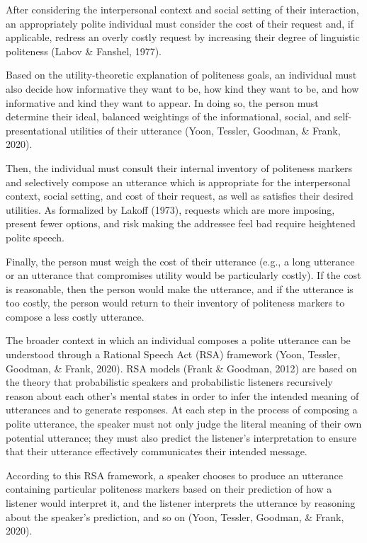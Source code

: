 \documentclass[
  english,
  man,floatsintext]{apa6}
\begin{document}
After considering the interpersonal context and social setting of their interaction, an appropriately polite individual must consider the cost of their request and, if applicable, redress an overly costly request by increasing their degree of linguistic politeness (Labov \& Fanshel, 1977).

Based on the utility-theoretic explanation of politeness goals, an individual must also decide how informative they want to be, how kind they want to be, and how informative and kind they want to appear. In doing so, the person must determine their ideal, balanced weightings of the informational, social, and self- presentational utilities of their utterance (Yoon, Tessler, Goodman, \& Frank, 2020).

Then, the individual must consult their internal inventory of politeness markers and selectively compose an utterance which is appropriate for the interpersonal context, social setting, and cost of their request, as well as satisfies their desired utilities. As formalized by Lakoff (1973), requests which are more imposing, present fewer options, and risk making the addressee feel bad require heightened polite speech.

Finally, the person must weigh the cost of their utterance (e.g., a long utterance or an utterance that compromises utility would be particularly costly). If the cost is reasonable, then the person would make the utterance, and if the utterance is too costly, the person would return to their inventory of politeness markers to compose a less costly utterance.

The broader context in which an individual composes a polite utterance can be understood through a Rational Speech Act (RSA) framework (Yoon, Tessler, Goodman, \& Frank, 2020). RSA models (Frank \& Goodman, 2012) are based on the theory that probabilistic speakers and probabilistic listeners recursively reason about each other's mental states in order to infer the intended meaning of utterances and to generate responses. At each step in the process of composing a polite utterance, the speaker must not only judge the literal meaning of their own potential utterance; they must also predict the listener's interpretation to ensure that their utterance effectively communicates their intended message.

According to this RSA framework, a speaker chooses to produce an utterance containing particular politeness markers based on their prediction of how a listener would interpret it, and the listener interprets the utterance by reasoning about the speaker's prediction, and so on (Yoon, Tessler, Goodman, \& Frank, 2020).
\end{document}
